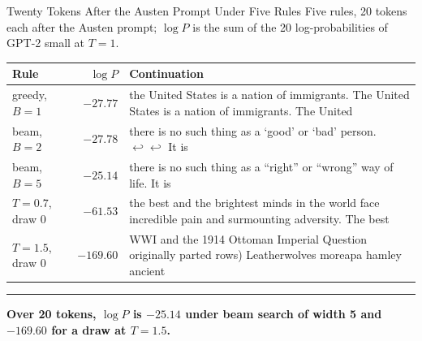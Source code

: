 \documentclass[8pt,aspectratio=169]{beamer}
\newcommand{\bottomnote}[1]{%
\vfill\vspace{-2mm}
\textcolor{mllavender2}{\rule{\textwidth}{0.4pt}}
\vspace{1mm}\footnotesize\textbf{#1}}
\begin{document}
\begin{frame}[t]{Twenty Tokens After the Austen Prompt Under Five Rules}
Five rules, 20 tokens each after the Austen prompt; $\log P$ is the sum of the 20 log-probabilities of GPT-2 small at $T = 1$.

\vspace{2mm}
\small
\begin{tabular}{lrp{10.6cm}}
\toprule
Rule & $\log P$ & Continuation \\
\midrule
greedy, $B = 1$ & $-27.77$ & the United States is a nation of immigrants. The United States is a nation of immigrants. The United \\
beam, $B = 2$ & $-27.78$ & there is no such thing as a `good' or `bad' person. $\hookleftarrow\hookleftarrow$ It is \\
beam, $B = 5$ & $-25.14$ & there is no such thing as a ``right'' or ``wrong'' way of life. It is \\
$T = 0.7$, draw 0 & $-61.53$ & the best and the brightest minds in the world face incredible pain and surmounting adversity. The best \\
$T = 1.5$, draw 0 & $-169.60$ & WWI and the 1914 Ottoman Imperial Question originally parted rows) Leatherwolves moreapa hamley ancient \\
\bottomrule
\end{tabular}

\normalsize
\bottomnote{Over 20 tokens, $\log P$ is $-25.14$ under beam search of width 5 and $-169.60$ for a draw at $T = 1.5$.}
\end{frame}
\end{document}
